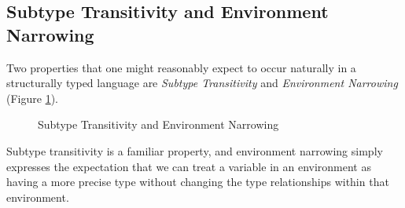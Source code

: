 \documentclass{llncs}
\numberwithin{subcase}{casethm}
\numberwithin{casethm}{theorem}
\numberwithin{casethm}{lemma}
\begin{document}
\subsection{Subtype Transitivity and Environment Narrowing}
Two properties that one might reasonably expect 
to occur naturally in a structurally typed language are 
\emph{Subtype Transitivity} and \emph{Environment Narrowing}
(Figure \ref{f:trans_narrowing}).
\begin{figure}[h]
\caption{Subtype Transitivity and Environment Narrowing}
\label{f:trans_narrowing}
\end{figure}
Subtype transitivity is a familiar property, 
and environment narrowing simply expresses the 
expectation that we can treat a variable in an 
environment as having a more precise type without 
changing the type relationships within that environment.
\end{document}
